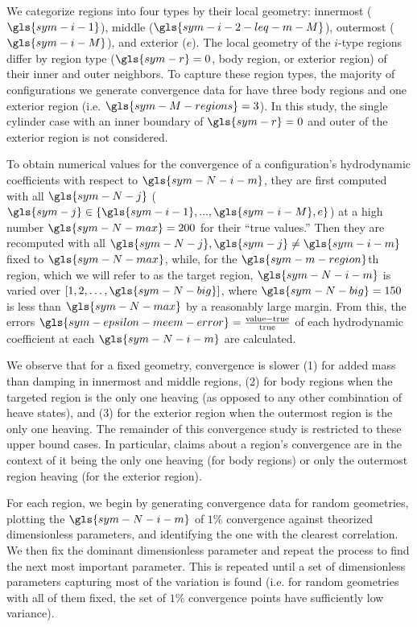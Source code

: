 \documentclass[ASNA,twocolumn]{USG} %
\begin{document}
We categorize regions into four types by their local geometry: innermost ($\gls{sym-i-1}$), middle ($\gls{sym-i-2-leq-m-M}$), outermost ($\gls{sym-i-M}$), and exterior ($e$). 
The local geometry of the $i$-type regions differ by region type ($\gls{sym-r}=0$, body region, or exterior region) of their inner and outer neighbors. 
To capture these region types, the majority of configurations we generate convergence data for have three body regions and one exterior region (i.e. $\gls{sym-M-regions} = 3$).
In this study, the single cylinder case with an inner boundary of $\gls{sym-r}=0$ and outer \neighbour{} of the exterior region is not considered. 


To obtain numerical values for the convergence of a configuration's hydrodynamic coefficients with respect to $\gls{sym-N-i-m}$, 
they are first computed with all $\gls{sym-N-j}$ ($\gls{sym-j}\in\{\gls{sym-i-1},...,\gls{sym-i-M}, e\}$) at a high number $\gls{sym-N-max} = 200$ for their ``true values.'' 
Then they are recomputed with all $\gls{sym-N-j}, \gls{sym-j}\neq \gls{sym-i-m}$ fixed to $\gls{sym-N-max}$, while, for the $\gls{sym-m-region}$th region, which we will refer to as the target region, 
$\gls{sym-N-i-m}$ is varied over $[1, 2, \dots, \gls{sym-N-big}]$, where $\gls{sym-N-big} = 150$ is less than $\gls{sym-N-max}$ by a reasonably large margin. 
From this, the errors $\gls{sym-epsilon-meem-error} = \frac{\text{value}-\text{true}}{\text{true}}$ of each hydrodynamic coefficient at each $\gls{sym-N-i-m}$ are calculated.

We observe that for a fixed geometry, convergence is slower 
(1) for added mass than damping in innermost and middle regions, 
(2) for body regions when the targeted region is the only one heaving (as opposed to any other combination of heave states), and 
(3) for the exterior region when the outermost region is the only one heaving. 
The remainder of this convergence study is restricted to these upper bound cases. 
In particular, claims about a region's convergence are in the context of it being the only one heaving (for body regions) or only the outermost region heaving (for the exterior region).

For each region, we begin by generating convergence data for random geometries, plotting the $\gls{sym-N-i-m}$ of $1\%$ convergence against theorized dimensionless parameters, and identifying the one with the clearest correlation. 
We then fix the dominant dimensionless parameter and repeat the process to find the next most important parameter. 
This is repeated until a set of dimensionless parameters capturing most of the variation is found 
(i.e. for random geometries with all of them fixed, the set of $1\%$ convergence points have sufficiently low variance).
\end{document}
